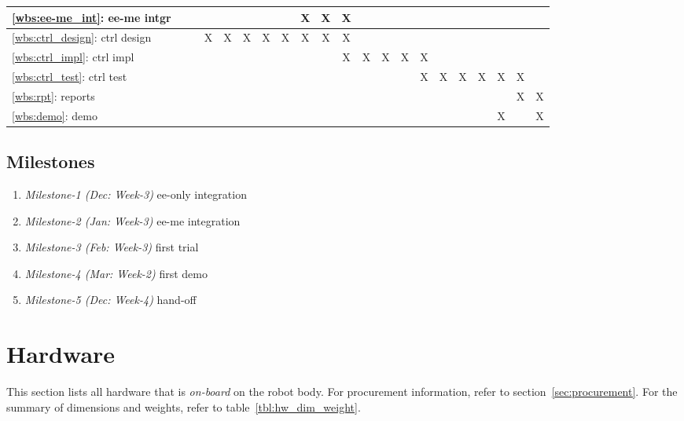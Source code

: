 \documentclass[a4paper, 10pt, twocolumn, titlepage]{article}
\begin{document}
\begin{table}[!tb]
\begin{tabular}{l cccc cccc cccc cccc cccc}
    \ref{wbs:ee-me_int}: ee-me intgr &
       &   &   &   &
       &   &   & X &
     X & X &   &   &
       &   &   &   &
       &   &   &   \\

    \midrule[1.0pt]
    \ref{wbs:ctrl_design}: ctrl design &
       &   & X & X &
     X & X & X & X &
     X & X &   &   &
       &   &   &   &
       &   &   &   \\

    \ref{wbs:ctrl_impl}: ctrl impl &
       &   &   &   &
       &   &   &   &
       & X & X & X &
     X & X &   &   &
       &   &   &   \\
    
    \ref{wbs:ctrl_test}: ctrl test &
       &   &   &   &
       &   &   &   &
       &   &   &   &
       & X & X & X &
     X & X & X &   \\
              
    \midrule[1.0pt]
    \ref{wbs:rpt}: reports &
       &   &   &   &
       &   &   &   &
       &   &   &   &
       &   &   &   &
       &   & X & X \\

    \ref{wbs:demo}: demo &
       &   &   &   &
       &   &   &   &
       &   &   &   &
       &   &   &   &
       & X &   & X \\
                     
    \bottomrule[1.5pt]
  \end{tabular}
\label{tbl:gantt-chart}
\end{table}

\subsection{Milestones}
\begin{enumerate}
  \item \emph{Milestone-1 (Dec: Week-3)} ee-only integration
  \item \emph{Milestone-2 (Jan: Week-3)} ee-me integration
  \item \emph{Milestone-3 (Feb: Week-3)} first trial
  \item \emph{Milestone-4 (Mar: Week-2)} first demo
  \item \emph{Milestone-5 (Dec: Week-4)} hand-off
\end{enumerate}
    
\section{Hardware}
This section lists all hardware that is \emph{on-board} on the robot body.
For procurement information, refer to section~\ref{sec:procurement}.
For the summary of dimensions and weights, refer to table~\ref{tbl:hw_dim_weight}.
\end{document}
